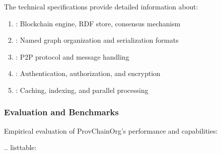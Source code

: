 \documentclass[letterpaper,10pt,english]{sphinxmanual}
\begin{document}
\sphinxAtStartPar
{}
The technical specifications provide detailed information about:
\begin{enumerate}
%
\item {} 
\sphinxAtStartPar
{}: Blockchain engine, RDF store, consensus mechanism

\item {} 
\sphinxAtStartPar
{}: Named graph organization and serialization formats

\item {} 
\sphinxAtStartPar
{}: P2P protocol and message handling

\item {} 
\sphinxAtStartPar
{}: Authentication, authorization, and encryption

\item {} 
\sphinxAtStartPar
{}: Caching, indexing, and parallel processing

\end{enumerate}


\subsubsection{Evaluation and Benchmarks}
\label{\detokenize{research/index:evaluation-and-benchmarks}}
\sphinxAtStartPar
Empirical evaluation of ProvChainOrg’s performance and capabilities:

\sphinxAtStartPar
{}
.. list\sphinxhyphen{}table:
\end{document}
